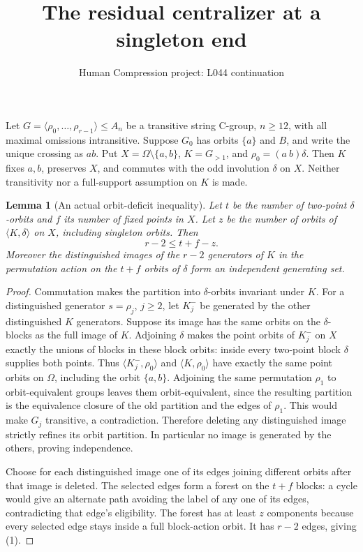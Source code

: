 \documentclass[11pt,a4paper]{article}
\title{The residual centralizer at a singleton end}
\author{Human Compression project: L044 continuation}
\date{}
\newtheorem{lemma}{Lemma}
\newcommand{\gen}[1]{\langle#1\rangle}
\begin{document}
\maketitle
Let $G=\gen{\rho_0,\ldots,\rho_{r-1}}\leq A_n$ be a transitive
string C-group, $n\geq12$, with all maximal omissions intransitive.
Suppose $G_0$ has orbits $\{a\}$ and $B$, and write the unique
crossing as $ab$. Put $X=\Omega\setminus\{a,b\}$,
$K=G_{>1}$, and $\rho_0=(a\ b)\delta$.
Then $K$ fixes $a,b$, preserves $X$, and commutes with the odd
involution $\delta$ on $X$. Neither transitivity nor a full-support
assumption on $K$ is made.

\begin{lemma}[An actual orbit-deficit inequality]\label{deficit}
Let $t$ be the number of two-point $\delta$-orbits and $f$ its
number of fixed points in $X$. Let $z$ be the number of orbits
of $\gen{K,\delta}$ on $X$, including singleton orbits. Then
\[
                    r-2\leq t+f-z.                    \tag{1}
\]
Moreover the distinguished images of the $r-2$ generators of $K$
in the permutation action on the $t+f$ orbits of $\delta$
form an independent generating set.
\end{lemma}
\begin{proof}
Commutation makes the partition into $\delta$-orbits invariant
under $K$. For a distinguished generator $s=\rho_j$,
$j\geq2$, let $K^-_j$ be generated by the other distinguished
$K$ generators. Suppose its image has the same orbits on the
$\delta$-blocks as the full image of $K$.
Adjoining $\delta$ makes the point orbits of $K^-_j$ on $X$
exactly the unions of blocks in these block orbits: inside
every two-point block $\delta$ supplies both points.
Thus $\gen{K^-_j,\rho_0}$ and $\gen{K,\rho_0}$ have exactly
the same point orbits on $\Omega$, including the orbit $\{a,b\}$.
Adjoining the same permutation $\rho_1$ to orbit-equivalent
groups leaves them orbit-equivalent, since the resulting
partition is the equivalence closure of the old partition
and the edges of $\rho_1$. This would make $G_j$ transitive,
a contradiction. Therefore deleting any distinguished image
strictly refines its orbit partition. In particular no image
is generated by the others, proving independence.

Choose for each distinguished image one of its edges joining
different orbits after that image is deleted. The selected
edges form a forest on the $t+f$ blocks: a cycle would give
an alternate path avoiding the label of any one of its edges,
contradicting that edge's eligibility. The forest has at least
$z$ components because every selected edge stays inside a
full block-action orbit. It has $r-2$ edges, giving (1).
\end{proof}
\end{document}
